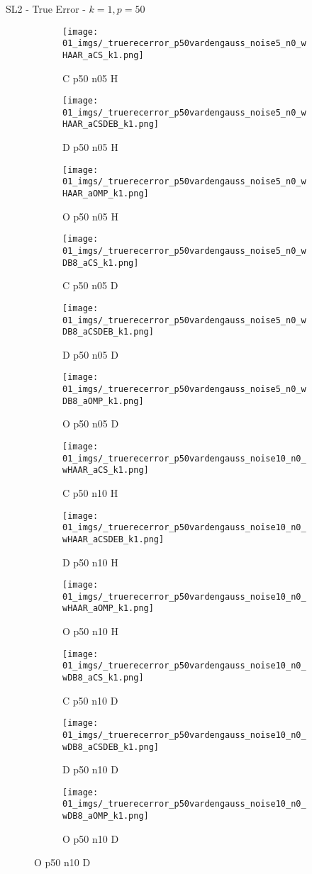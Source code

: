 \begin{frame}{SL2 - True Error - $k=1,p=50$}{}
\begin{figure}
\begin{subfigure}{0.13\textwidth}
\texttt{[image: 01\_imgs/\_truerecerror\_p50vardengauss\_noise5\_n0\_wHAAR\_aCS\_k1.png]}
\caption*{\tiny C p50 n05 H}
\end{subfigure}
\begin{subfigure}{0.13\textwidth}
\texttt{[image: 01\_imgs/\_truerecerror\_p50vardengauss\_noise5\_n0\_wHAAR\_aCSDEB\_k1.png]}
\caption*{\tiny D p50 n05 H}
\end{subfigure}
\begin{subfigure}{0.13\textwidth}
\texttt{[image: 01\_imgs/\_truerecerror\_p50vardengauss\_noise5\_n0\_wHAAR\_aOMP\_k1.png]}
\caption*{\tiny O p50 n05 H}
\end{subfigure}
\begin{subfigure}{0.13\textwidth}
\texttt{[image: 01\_imgs/\_truerecerror\_p50vardengauss\_noise5\_n0\_wDB8\_aCS\_k1.png]}
\caption*{\tiny C p50 n05 D}
\end{subfigure}
\begin{subfigure}{0.13\textwidth}
\texttt{[image: 01\_imgs/\_truerecerror\_p50vardengauss\_noise5\_n0\_wDB8\_aCSDEB\_k1.png]}
\caption*{\tiny D p50 n05 D}
\end{subfigure}
\begin{subfigure}{0.13\textwidth}
\texttt{[image: 01\_imgs/\_truerecerror\_p50vardengauss\_noise5\_n0\_wDB8\_aOMP\_k1.png]}
\caption*{\tiny O p50 n05 D}
\end{subfigure}

\vspace{5pt}

\begin{subfigure}{0.13\textwidth}
\texttt{[image: 01\_imgs/\_truerecerror\_p50vardengauss\_noise10\_n0\_wHAAR\_aCS\_k1.png]}
\caption*{\tiny C p50 n10 H}
\end{subfigure}
\begin{subfigure}{0.13\textwidth}
\texttt{[image: 01\_imgs/\_truerecerror\_p50vardengauss\_noise10\_n0\_wHAAR\_aCSDEB\_k1.png]}
\caption*{\tiny D p50 n10 H}
\end{subfigure}
\begin{subfigure}{0.13\textwidth}
\texttt{[image: 01\_imgs/\_truerecerror\_p50vardengauss\_noise10\_n0\_wHAAR\_aOMP\_k1.png]}
\caption*{\tiny O p50 n10 H}
\end{subfigure}
\begin{subfigure}{0.13\textwidth}
\texttt{[image: 01\_imgs/\_truerecerror\_p50vardengauss\_noise10\_n0\_wDB8\_aCS\_k1.png]}
\caption*{\tiny C p50 n10 D}
\end{subfigure}
\begin{subfigure}{0.13\textwidth}
\texttt{[image: 01\_imgs/\_truerecerror\_p50vardengauss\_noise10\_n0\_wDB8\_aCSDEB\_k1.png]}
\caption*{\tiny D p50 n10 D}
\end{subfigure}
\begin{subfigure}{0.13\textwidth}
\texttt{[image: 01\_imgs/\_truerecerror\_p50vardengauss\_noise10\_n0\_wDB8\_aOMP\_k1.png]}
\caption*{\tiny O p50 n10 D}
\end{subfigure}


\end{figure}
\end{frame}
